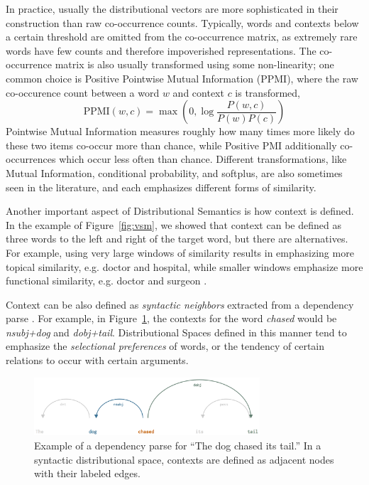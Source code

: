 \documentclass[letterpaper]{article}
\begin{document}
In practice, usually the distributional vectors are more sophisticated in their
construction than raw co-occurrence counts. Typically, words and contexts below
a certain threshold are omitted from the co-occurrence matrix, as extremely
rare words have few counts and therefore impoverished representations. The
co-occurrence matrix is also usually transformed using some non-linearity;
one common choice is Positive Pointwise Mutual Information (PPMI), where the
raw co-occurence count between a word $w$ and context $c$ is transformed,
\begin{equation*}
  \text{PPMI}(w, c) = \max\left(0, \log\frac{P(w, c)}{P(w)P(c)}\right)
\end{equation*}
Pointwise Mutual Information measures roughly how many times more likely
do these two items co-occur more than chance, while Positive PMI additionally
co-occurrences which occur less often than chance. Different transformations,
like Mutual Information, conditional probability, and softplus, are also
sometimes seen in the literature, and each emphasizes different forms of
similarity.

Another important aspect of Distributional Semantics is how context is defined.
In the example of Figure~\ref{fig:vsm}, we showed that context can be defined
as three words to the left and right of the target word, but there are
alternatives. For example, using very large windows of similarity results in
emphasizing more topical similarity, e.g. doctor and hospital, while smaller
windows emphasize more functional similarity, e.g. doctor and surgeon
\cite{needcite,levy:2014:acl}.

Context can be also defined as {\em syntactic neighbors} extracted
from a dependency parse \cite{pado:2007:cl}. For example, in Figure~\ref{fig:syn},
the contexts for the word {\em chased} would be {\em nsubj+dog} and {\em
dobj+tail}. Distributional Spaces defined in this manner tend to emphasize
the {\em selectional preferences} of words, or the tendency of certain
relations to occur with certain arguments.

\begin{figure}
  \centering
  \includegraphics[width=0.75\textwidth]{figures/syn}
\caption{Example of a dependency parse for ``The dog chased its tail.'' In
a syntactic distributional space, contexts are defined as adjacent nodes
with their labeled edges.}
\label{fig:syn}
\end{figure}
\end{document}
